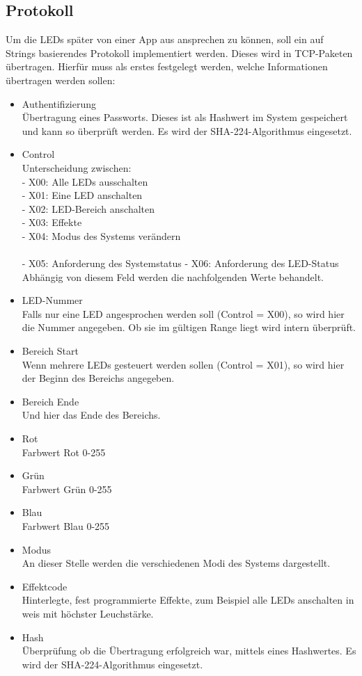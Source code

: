 
\subsection{Protokoll}
Um die LEDs später von einer App aus ansprechen zu können, soll ein auf Strings basierendes Protokoll implementiert werden. Dieses wird in TCP-Paketen übertragen. Hierfür muss als erstes festgelegt werden, welche Informationen übertragen werden sollen: \\
\begin{itemize}
\item Authentifizierung\\
Übertragung eines Passworts. Dieses ist als Hashwert im System gespeichert und kann so überprüft werden. Es wird der SHA-224-Algorithmus eingesetzt.
\item Control\\
Unterscheidung zwischen:\\
	- X00: Alle LEDs ausschalten\\
	- X01: Eine LED anschalten\\
	- X02: LED-Bereich anschalten\\
	- X03: Effekte\\
	- X04: Modus des Systems verändern\\\\
	- X05: Anforderung des Systemstatus
	- X06: Anforderung des LED-Status
Abhängig von diesem Feld werden die nachfolgenden Werte behandelt.
\item LED-Nummer\\
Falls nur eine LED angesprochen werden soll (Control = X00), so wird hier die Nummer angegeben. Ob sie im gültigen Range liegt wird intern überprüft.
\item Bereich Start\\
Wenn mehrere LEDs gesteuert werden sollen (Control = X01), so wird hier der Beginn des Bereichs angegeben.
\item Bereich Ende\\
Und hier das Ende des Bereichs.
\item Rot\\
Farbwert Rot 0-255
\item Grün\\
Farbwert Grün 0-255
\item Blau\\
Farbwert Blau 0-255
\item Modus\\
An dieser Stelle werden die verschiedenen Modi des Systems dargestellt.
\item Effektcode\\
Hinterlegte, fest programmierte Effekte, zum Beispiel alle LEDs anschalten in weis mit höchster Leuchstärke.
\item Hash\\
Überprüfung ob die Übertragung erfolgreich war, mittels eines Hashwertes. Es wird der SHA-224-Algorithmus eingesetzt.
\end{itemize}
